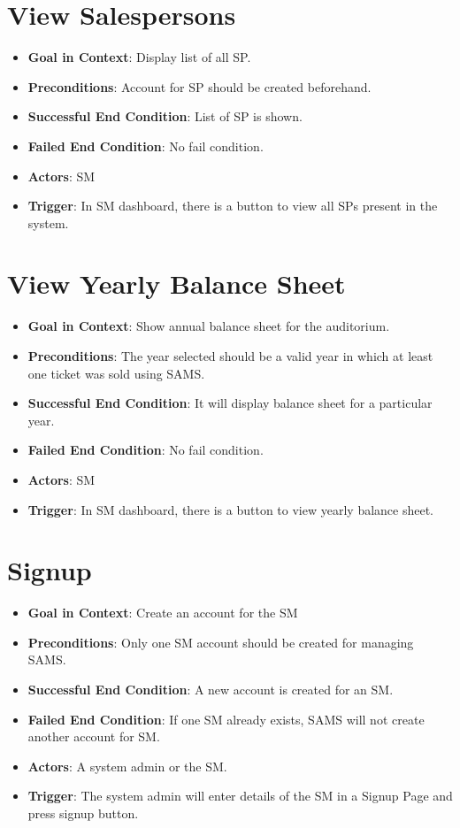 \documentclass{scrreprt}
\begin{document}
\section{View Salespersons}
\begin{itemize}
\item \textbf{Goal in Context}: Display list of all SP.
\item \textbf{Preconditions}: Account for SP should be created beforehand.
\item \textbf{Successful End Condition}:  List of SP is shown.
\item \textbf{Failed End Condition}: No fail condition.
\item \textbf{Actors}: SM
\item \textbf{Trigger}: In SM dashboard, there is a button to view all SPs present in the system.
\end{itemize}


\section{View Yearly Balance Sheet}
\begin{itemize}
\item \textbf{Goal in Context}: Show annual balance sheet for the auditorium.
\item \textbf{Preconditions}: The year selected should be a valid year in which at least one ticket was sold using SAMS.  
\item \textbf{Successful End Condition}: It will display balance sheet for a particular year.
\item \textbf{Failed End Condition}: No fail condition.
\item \textbf{Actors}: SM
\item \textbf{Trigger}: In SM dashboard, there is a button to view  yearly balance sheet. 
\end{itemize}


\section{Signup}
\begin{itemize}
\item \textbf{Goal in Context}: Create an account for the SM
\item \textbf{Preconditions}: Only one SM account should be created for managing SAMS.
\item \textbf{Successful End Condition}: A new account is created for an SM. 
\item \textbf{Failed End Condition}: If one SM already exists, SAMS will not create another account for SM.
\item \textbf{Actors}: A system admin or the SM. 
\item \textbf{Trigger}: The system admin will enter details of the SM in a Signup Page and press signup button. 
\end{itemize}
\end{document}

